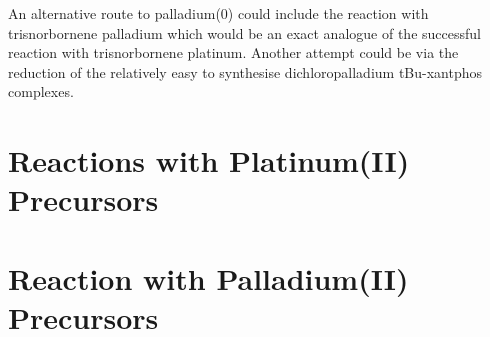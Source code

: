 An alternative route to palladium(0) could include the reaction with trisnorbornene palladium which would be an exact analogue of the successful reaction with trisnorbornene platinum.  Another attempt could be via the reduction of the relatively easy to synthesise dichloropalladium tBu-xantphos complexes.  

\section{Reactions with Platinum(II) Precursors}

\section{Reaction with Palladium(II) Precursors}







